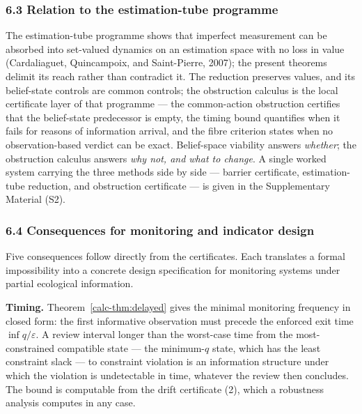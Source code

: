 \documentclass[10pt,twocolumn]{article}
\theoremstyle{definition}
\begin{document}
\subsubsection{6.3 Relation to the estimation-tube
programme}\label{calc-relation-to-the-estimation-tube-programme}

The estimation-tube programme shows that imperfect measurement can be absorbed into set-valued dynamics on an estimation space with no loss in value (Cardaliaguet, Quincampoix, and Saint-Pierre, 2007); the present theorems delimit its reach rather than contradict it. The reduction preserves values, and its belief-state controls are common controls; the obstruction calculus is the local certificate layer of that programme --- the common-action obstruction certifies that the belief-state predecessor is empty, the timing bound quantifies when it fails for reasons of information arrival, and the fibre criterion states when no observation-based verdict can be exact. Belief-space viability answers \emph{whether}; the obstruction calculus answers \emph{why not, and what to change}. A single worked system carrying the three methods side by side --- barrier certificate, estimation-tube reduction, and obstruction certificate --- is given in the Supplementary Material (S2).

\subsubsection{6.4 Consequences for monitoring and indicator
design}\label{calc-consequences-for-monitoring-and-indicator-design}



Five consequences follow directly from the certificates. Each translates
a formal impossibility into a concrete design specification for
monitoring systems under partial ecological information.

\textbf{Timing.} Theorem~\ref{calc-thm:delayed} gives the minimal monitoring frequency in
closed form: the first informative observation must precede the enforced
exit time \(\inf q / \varepsilon\). A review interval longer than the
worst-case time from the most-constrained compatible state --- the
minimum-\(q\) state, which has the least constraint slack --- to
constraint violation is an information structure under which the
violation is undetectable in time, whatever the review then concludes.
The bound is computable from the drift certificate (2), which a robustness analysis computes in any case.
\end{document}
